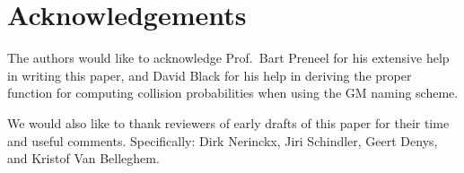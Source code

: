 \section{Acknowledgements}\label{sec:7}

The authors would like to acknowledge Prof.~Bart Preneel for his
extensive help in writing this paper, and David Black for his help in
deriving the proper function for computing collision probabilities when
using the GM naming scheme.

We would also like to thank reviewers of early drafts of this paper for
their time and useful comments. Specifically: Dirk Nerinckx, Jiri
Schindler, Geert Denys, and Kristof Van Belleghem.

